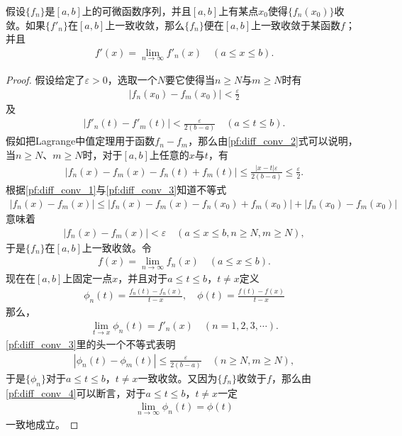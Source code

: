 \documentclass[../../main.tex]{subfiles}%
\begin{document}
\begin{theorem}
假设$\{f_n\}$是$[a,b]$上的可微函数序列，并且$[a,b]$上有某点$x_0$使得$\{f_n(x_0)\}$收敛。如果$\{f'_n\}$在$[a,b]$上一致收敛，那么$\{f_n\}$便在$[a,b]$上一致收敛于某函数$f$；并且
\begin{align}
f'(x) = \lim\limits_{n\to\infty}f'_n(x) \quad (a\leqslant x\leqslant b).
\label{thm:diff_conv_main}
\end{align}
\end{theorem}
\begin{proof}

假设给定了$\varepsilon>0$，选取一个$N$要它使得当$n\geqslant N$与$m\geqslant N$时有
\begin{align}
|f_n(x_0)-f_m(x_0)| < \frac{\varepsilon}{2}
\label{pf:diff_conv_1}
\end{align}
及
\begin{align}
|f'_n(t)-f'_m(t)| < \frac{\varepsilon}{2(b-a)} \quad (a\leqslant t\leqslant b).
\label{pf:diff_conv_2}
\end{align}
假如把Lagrange中值定理用于函数$f_n-f_m$，那么由\eqref{pf:diff_conv_2}式可以说明，当$n\geqslant N$、$m\geqslant N$时，对于$[a,b]$上任意的$x$与$t$，有
\begin{align}
|f_n(x)-f_m(x)-f_n(t)+f_m(t)| \leqslant \frac{|x-t|\varepsilon}{2(b-a)} \leqslant \frac{\varepsilon}{2}.
\label{pf:diff_conv_3}
\end{align}
根据\eqref{pf:diff_conv_1}与\eqref{pf:diff_conv_3}知道不等式
\begin{align*}
|f_n(x)-f_m(x)| \leqslant |f_n(x)-f_m(x)-f_n(x_0)+f_m(x_0)| + |f_n(x_0)-f_m(x_0)|
\end{align*}
意味着
\begin{align*}
|f_n(x)-f_m(x)| < \varepsilon \quad (a\leqslant x\leqslant b, n\geqslant N, m\geqslant N),
\end{align*}
于是$\{f_n\}$在$[a,b]$上一致收敛。令
\begin{align*}
f(x) = \lim\limits_{n\to\infty}f_n(x) \quad (a\leqslant x\leqslant b).
\end{align*}
现在在$[a,b]$上固定一点$x$，并且对于$a\leqslant t\leqslant b$，$t\neq x$定义
\begin{align}
\phi_n(t) = \frac{f_n(t)-f_n(x)}{t-x}, \quad \phi(t) = \frac{f(t)-f(x)}{t-x}
\label{pf:diff_conv_4}
\end{align}
那么，
\begin{align}
\lim\limits_{t\to x}\phi_n(t) = f'_n(x) \quad (n=1,2,3,\cdots).
\label{pf:diff_conv_5}
\end{align}
\eqref{pf:diff_conv_3}里的头一个不等式表明
\begin{align*}
|\phi_n(t)-\phi_m(t)| \leqslant \frac{\varepsilon}{2(b-a)} \quad (n\geqslant N, m\geqslant N),
\end{align*}
于是$\{\phi_n\}$对于$a\leqslant t\leqslant b$，$t\neq x$一致收敛。又因为$\{f_n\}$收敛于$f$，那么由\eqref{pf:diff_conv_4}可以断言，对于$a\leqslant t\leqslant b$，$t\neq x$一定
\begin{align}
\lim\limits_{n\to\infty}\phi_n(t) = \phi(t)
\label{pf:diff_conv_6}
\end{align}
一致地成立。


\end{proof}
\end{document}
